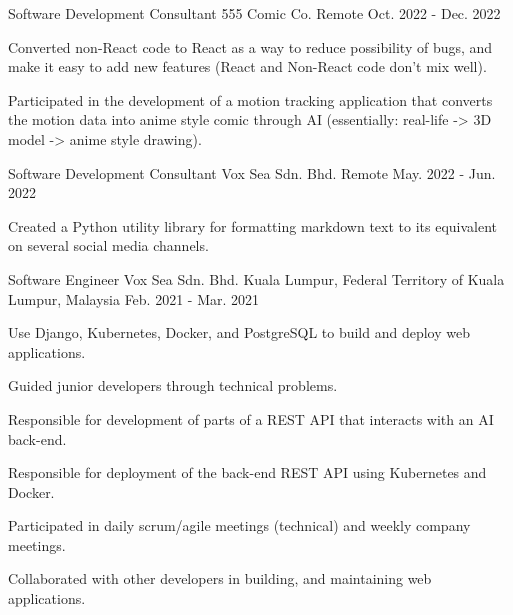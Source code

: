 

\begin{cventries}

\cventry
  {Software Development Consultant} %
  {555 Comic Co.} %
  {Remote} %
  {Oct. 2022 - Dec. 2022} %
  {
    \begin{cvitems} %
      \item {Converted non-React code to React as a way to reduce possibility of bugs, and make it easy to add new features (React and Non-React code don't mix well).}
      \item {Participated in the development of a motion tracking application that converts the motion data into anime style comic through AI (essentially: real-life -> 3D model -> anime style drawing).}
    \end{cvitems}
  }


  \cventry
    {Software Development Consultant} %
    {Vox Sea Sdn. Bhd.} %
    {Remote} %
    {May. 2022 - Jun. 2022} %
    {
      \begin{cvitems} %
        \item {Created a Python utility library for formatting markdown text to its equivalent on several social media channels.}
      \end{cvitems}
    }

  \cventry
    {Software Engineer} %
    {Vox Sea Sdn. Bhd.} %
    {Kuala Lumpur, Federal Territory of Kuala Lumpur, Malaysia} %
    {Feb. 2021 - Mar. 2021} %
    {
      \begin{cvitems} %
        \item {Use Django, Kubernetes, Docker, and PostgreSQL to build and deploy web applications.}
        \item {Guided junior developers through technical problems.}
        \item {Responsible for development of parts of a REST API that interacts with an AI back-end.}
        \item {Responsible for deployment of the back-end REST API using Kubernetes and Docker.}
        \item {Participated in daily scrum/agile meetings (technical) and weekly company meetings.}
        \item {Collaborated with other developers in building, and maintaining web applications.}
      \end{cvitems}
    }


\end{cventries}
